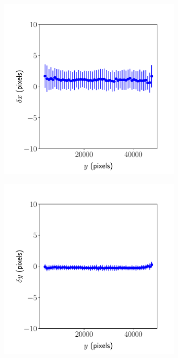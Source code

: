 \documentclass{article}
\begin{document}
\begin{figure}[ht]
\begin{subfigure}{0.24\linewidth}
		\caption{}
		\label{fig:sinewave4yx2}
	\end{subfigure}
	\begin{subfigure}{0.24\linewidth}
		\includegraphics[width=\linewidth]{sine-wave-4-xy-2.pdf}
		\caption{}
		\label{fig:sinewave4xy2}
	\end{subfigure}
	\begin{subfigure}{0.24\linewidth}
		\includegraphics[width=\linewidth]{sine-wave-4-yy-2.pdf}

\end{subfigure}
\end{figure}
\end{document}
